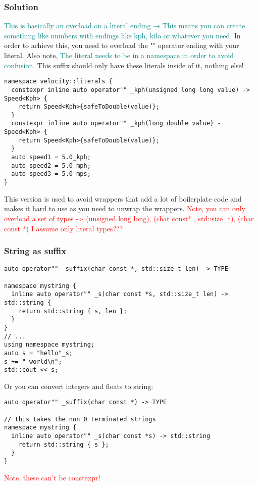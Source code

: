 \documentclass[main.tex,fontsize=8pt,paper=a4,paper=portrait,DIV=calc,]{scrartcl}
\begin{document}
\subsubsection{Solution}
\textcolor{teal}{This is basically an overload on a literal ending → This means you can create something like numbers with endings like kph, kilo or whatever you need.}\newline
In order to achieve this, you need to overload the "" operator ending with your literal.\newline
Also note, \textcolor{teal}{The literal needs to be in a namespace in order to avoid confusion.}\newline
This suffix should only have these literals inside of it, nothing else!
\begin{lstlisting}
namespace velocity::literals {
  constexpr inline auto operator"" _kph(unsigned long long value) -> Speed<Kph> {
    return Speed<Kph>{safeToDouble(value)};
  }
  constexpr inline auto operator"" _kph(long double value) - Speed<Kph> {
    return Speed<Kph>{safeToDouble(value)};
  }
  auto speed1 = 5.0_kph;
  auto speed2 = 5.0_mph;
  auto speed3 = 5.0_mps;
}
\end{lstlisting}
This version is used to avoid wrappers that add a lot of boilerplate code and makes it hard to use as you need to unwrap the wrappers.
\textcolor{red}{Note, you can only overload a set of types -> (unsigned long long), (char const* , std::size\_t), (char const *)\newline
I assume only literal types???}

\subsubsection{String as suffix}
\begin{lstlisting}
auto operator"" _suffix(char const *, std::size_t len) -> TYPE

namespace mystring {
  inline auto operator"" _s(char const *s, std::size_t len) -> std::string {
    return std::string { s, len };
  }
}
// ...
using namespace mystring;
auto s = "hello"_s;
s += " world\n";
std::cout << s;
\end{lstlisting}
Or you can convert integers and floats to string: 
\begin{lstlisting}
auto operator"" _suffix(char const *) -> TYPE

// this takes the non 0 terminated strings
namespace mystring {
  inline auto operator"" _s(char const *s) -> std::string
    return std::string { s };
  }
}
\end{lstlisting}
\textcolor{red}{Note, these can't be constexpr!}
\end{document}
